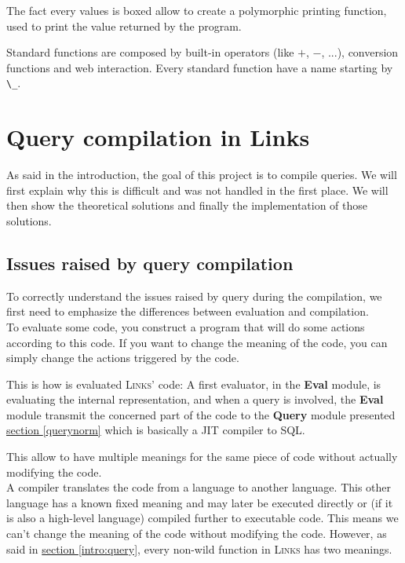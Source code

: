\documentclass[11pt]{article}
\newcommand\mysc[1]{{\rmfamily\textsc{#1}}\xspace}
\newcommand\links{\mysc{Links}}
\newcommand\sql{\mysc{SQL}}
\newcommand\refsec[1]{\hyperref[#1]{section \ref*{#1}}}
\newcommand\ocamlc[1]{\lstinline[language={[Objective]Caml},basicstyle=\ttfamily\normalsize]{#1}}
\newcommand\module[1]{{\bf #1}}
\begin{document}
The fact every values is boxed allow to create a polymorphic printing function, used to print the value returned by the program.

Standard functions are composed by built-in operators (like $+$, $-$, ...), conversion functions and web interaction. Every standard function have a name starting by \ocamlc{\_}.

\section{Query compilation in Links}

As said in the introduction, the goal of this project is to compile queries. We will first explain why this is difficult and was not handled in the first place. We will then show the theoretical solutions and finally the implementation of those solutions.

\subsection{Issues raised by query compilation}

To correctly understand the issues raised by query during the compilation, we first need to emphasize the differences between evaluation and compilation. \\

To evaluate some code, you construct a program that will do some actions according to this code. If you want to change the meaning of the code, you can simply change the actions triggered by the code. 

This is how is evaluated \links' code: A first evaluator, in the \module{Eval} module, is evaluating the internal representation, and when a query is involved, the \module{Eval} module transmit the concerned part of the code to the \module{Query} module presented \refsec{querynorm} which is basically a JIT compiler to \sql.

This allow to have multiple meanings for the same piece of code without actually modifying the code.\\

A compiler translates the code from a language to another language. This other language has a known fixed meaning and may later be executed directly or (if it is also a high-level language) compiled further to executable code. This means we can't change the meaning of the code without modifying the code. However, as said in \refsec{intro:query}, every non-wild function in \links has two meanings.
\end{document}
